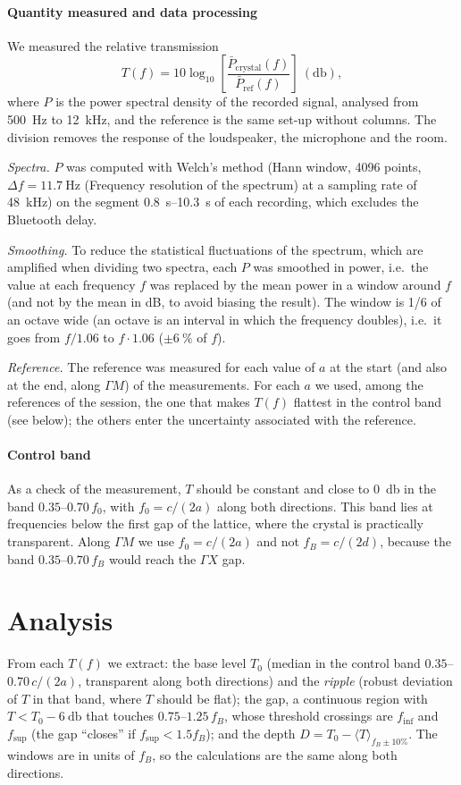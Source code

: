 \documentclass[9pt,a4paper,twocolumn]{extarticle}
\newcommand{\pbreak}{\par\vspace{3pt}}
\newcommand{\udB}{\decibel}
\newcommand{\finf}{\ensuremath{f_{\mathrm{inf}}}}
\newcommand{\fsup}{\ensuremath{f_{\mathrm{sup}}}}
\begin{document}
\paragraph{Quantity measured and data processing}
We measured the relative transmission
\begin{equation}
  T(f) = 10\log_{10}\!\left[\frac{\bar P_{\mathrm{crystal}}(f)}{\bar P_{\mathrm{ref}}(f)}\right]\ (\si{\decibel}),
\end{equation}
where $P$ is the power spectral density of the recorded signal, analysed from \SI{500}{\hertz} to \SI{12}{\kilo\hertz}, and the reference is the same set-up without columns. The division removes the response of the loudspeaker, the microphone and the room.
\pbreak
\emph{Spectra.} $P$ was computed with Welch's method (Hann window, 4096 points, $\Delta f = \SI{11.7}{\hertz}$ (Frequency resolution of the spectrum) at a sampling rate of \SI{48}{\kilo\hertz}) on the segment \SIrange{0.8}{10.3}{\second} of each recording, which excludes the Bluetooth delay.
\pbreak
\emph{Smoothing.} To reduce the statistical fluctuations of the spectrum, which are amplified when dividing two spectra, each $P$ was smoothed in power, i.e.\ the value at each frequency $f$ was replaced by the mean power in a window around $f$ (and not by the mean in dB, to avoid biasing the result). The window is 1/6 of an octave wide (an octave is an interval in which the frequency doubles), i.e.\ it goes from $f/1.06$ to $f\cdot1.06$ ($\pm\SI{6}{\percent}$ of $f$).
\pbreak
\emph{Reference.} The reference was measured for each value of $a$ at the start (and also at the end, along $\Gamma M$) of the measurements. For each $a$ we used, among the references of the session, the one that makes $T(f)$ flattest in the control band (see below); the others enter the uncertainty associated with the reference.

\paragraph{Control band}
As a check of the measurement, $T$ should be constant and close to \SI{0}{\decibel} in the band $0.35$--$0.70\,f_0$, with $f_0 = c/(2a)$ along both directions. This band lies at frequencies below the first gap of the lattice, where the crystal is practically transparent. Along $\Gamma M$ we use $f_0 = c/(2a)$ and not $f_B = c/(2d)$, because the band $0.35$--$0.70\,f_B$ would reach the $\Gamma X$ gap.

\section{Analysis}
From each $T(f)$ we extract: the base level $T_0$ (median in the control band $0.35$--$0.70\,c/(2a)$, transparent along both directions) and the \emph{ripple} (robust deviation of $T$ in that band, where $T$ should be flat); the gap, a continuous region with $T<T_0-\SI{6}{\udB}$ that touches $0.75$--$1.25\,f_B$, whose threshold crossings are \finf{} and \fsup{} (the gap ``closes'' if $\fsup<1.5f_B$); and the depth $D=T_0-\langle T\rangle_{f_B\pm10\%}$. The windows are in units of $f_B$, so the calculations are the same along both directions.
\end{document}
